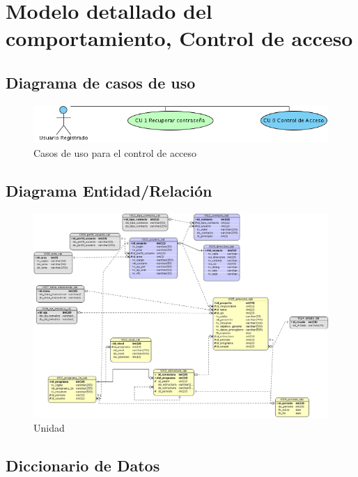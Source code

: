 \documentclass[10pt]{book}
\begin{document}
\chapter{Modelo detallado del comportamiento, Control de acceso} 

\section{Diagrama de casos de uso}

\begin{figure}[htbp!]
	\begin{center}
		\includegraphics[width=.3\textwidth]{images/CUcontrolAcceso}
		\caption{Casos de uso para el control de acceso}
		\label{fig:default}
	\end{center}
\end{figure}




\section{Diagrama Entidad/Relación}

  	\begin{figure}[h!]
 		\centering
 			\includegraphics[width=.8\textwidth]{images/modeloER.jpg}
 		\caption{Unidad}
 	\end{figure}

\section{Diccionario de Datos}

\end{document}
